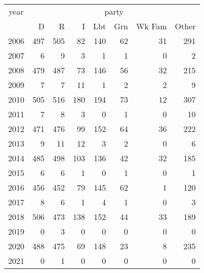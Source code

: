 \footnotesize\begin{tabular}[t]{lrrrrrrr}
\toprule
\multicolumn{1}{c}{year} & \multicolumn{7}{c}{party} \\
\cmidrule(l{3pt}r{3pt}){1-1} \cmidrule(l{3pt}r{3pt}){2-8}
  & D & R & I & Lbt & Grn & Wk Fam & Other\\
\midrule
2006 & 497 & 505 & 82 & 140 & 62 & 31 & 291\\
2007 & 6 & 9 & 3 & 1 & 1 & 0 & 2\\
2008 & 479 & 487 & 73 & 146 & 56 & 32 & 215\\
2009 & 7 & 7 & 11 & 1 & 2 & 2 & 9\\
2010 & 505 & 516 & 180 & 194 & 73 & 12 & 307\\
2011 & 7 & 8 & 3 & 0 & 1 & 0 & 10\\
2012 & 471 & 476 & 99 & 152 & 64 & 36 & 222\\
2013 & 9 & 11 & 12 & 3 & 2 & 0 & 6\\
2014 & 485 & 498 & 103 & 136 & 42 & 32 & 185\\
2015 & 6 & 6 & 1 & 0 & 1 & 0 & 1\\
2016 & 456 & 452 & 79 & 145 & 62 & 1 & 120\\
2017 & 8 & 6 & 1 & 4 & 1 & 0 & 3\\
2018 & 506 & 473 & 138 & 152 & 44 & 33 & 189\\
2019 & 0 & 3 & 0 & 0 & 0 & 0 & 0\\
2020 & 488 & 475 & 69 & 148 & 23 & 8 & 235\\
2021 & 0 & 1 & 0 & 0 & 0 & 0 & 0\\
\bottomrule
\end{tabular}
